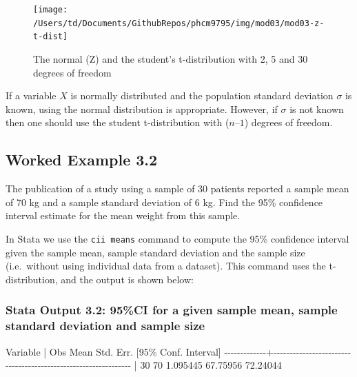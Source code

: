 \documentclass[
]{memoir}
\newenvironment{Shaded}{\begin{snugshade}}{\end{snugshade}}
\newcommand{\NormalTok}[1]{#1}
\begin{document}
\begin{figure}
\texttt{[image: /Users/td/Documents/GithubRepos/phcm9795/img/mod03/mod03-z-t-dist]} \caption{The normal (Z) and the student’s t-distribution with 2, 5 and 30 degrees of freedom}\label{fig:mod03-z-t-dist}
\end{figure}

If a variable \(X\) is normally distributed and the population standard deviation \(\sigma\) is known, using the normal distribution is appropriate. However, if \(\sigma\) is not known then one should use the student t-distribution with (\(n – 1\)) degrees of freedom.

\hypertarget{worked-example-3.2}{%
\subsection{Worked Example 3.2}\label{worked-example-3.2}}

The publication of a study using a sample of 30 patients reported a sample mean of 70 kg and a sample standard deviation of 6 kg. Find the 95\% confidence interval estimate for the mean weight from this sample.

In Stata we use the \texttt{cii\ means} command to compute the 95\% confidence interval given the sample mean, sample standard deviation and the sample size (i.e.~without using individual data from a dataset). This command uses the t-distribution, and the output is shown below:

\hypertarget{stata-output-3.2-95ci-for-a-given-sample-mean-sample-standard-deviation-and-sample-size}{%
\subsubsection*{Stata Output 3.2: 95\%CI for a given sample mean, sample standard deviation and sample size}\label{stata-output-3.2-95ci-for-a-given-sample-mean-sample-standard-deviation-and-sample-size}}

\begin{Shaded}
\begin{Highlighting}[]
\NormalTok{    Variable |        Obs        Mean    Std. Err.       [95\% Conf. Interval]}
\NormalTok{{-}{-}{-}{-}{-}{-}{-}{-}{-}{-}{-}{-}{-}+{-}{-}{-}{-}{-}{-}{-}{-}{-}{-}{-}{-}{-}{-}{-}{-}{-}{-}{-}{-}{-}{-}{-}{-}{-}{-}{-}{-}{-}{-}{-}{-}{-}{-}{-}{-}{-}{-}{-}{-}{-}{-}{-}{-}{-}{-}{-}{-}{-}{-}{-}{-}{-}{-}{-}{-}{-}{-}{-}{-}{-}{-}{-}}
\NormalTok{             |         30          70    1.095445        67.75956    72.24044}
\end{Highlighting}
\end{Shaded}
\end{document}

